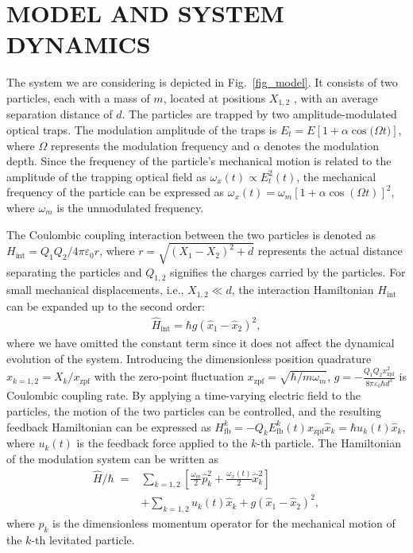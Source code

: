 \documentclass[
aps,
reprint,
superscriptaddress,
amsmath,amssymb,
pra
]{revtex4-2}
\begin{document}
\section{MODEL AND SYSTEM DYNAMICS}
The system we are considering is depicted in Fig.~\ref{fig_model}. It consists of two particles, each with a mass of $m$, located at positions $X_{1,2}$ , with an average separation distance of $d$. The particles are trapped by two amplitude-modulated optical traps. The modulation amplitude of the traps is $E_t = E[{ 1+ \alpha \cos ({\Omega }t})]$, where $\Omega$ represents the modulation frequency and $\alpha$ denotes the modulation depth. Since the frequency of the particle's mechanical motion is related to the amplitude of the trapping optical field as $\omega _x(t) \propto E_t^2(t)$, the mechanical frequency of the particle can be expressed as ${{\omega }_{x}}\left( t \right)={{\omega }_{m}}{{\left[ 1+\alpha \cos \left( {\Omega}t \right) \right]}^{2}}$, where $\omega_m$ is the unmodulated frequency.

The Coulombic coupling interaction between the two particles is denoted as $H_\text{int} = Q_1Q_2/4\pi \varepsilon _0r$, where $r = \sqrt{(X_1 - X_2)^2 + d}$ represents the actual distance separating the particles and $Q_{1,2}$ signifies the charges carried by the particles. For small mechanical displacements, i.e., $X_{1,2} \ll d$, the interaction Hamiltonian  $H_\text{int}$ can be expanded up to the second order:
\begin{align}
   {\hat{H}_{\operatorname{int}}} = \hbar g{{\left( {\hat{x}_{1}}-{\hat{x}_{2}} \right)}^{2}}, 
\end{align}
where we have omitted the constant term since it does not affect the dynamical evolution of the system. Introducing the dimensionless position quadrature $\hat x_{k = 1,2} = X_k/x_\text{zpf}$ with the zero-point fluctuation $x_\text{zpf} = \sqrt{\hbar/m\omega_m}$, $g = - \frac{Q_1Q_2x_\text{zpf}^2}{8\pi\varepsilon_0\hbar d^3}$ is Coulombic coupling rate. By applying a time-varying electric field to the particles, the motion of the two particles can be controlled, and the resulting feedback Hamiltonian can be expressed as $H_\text{fb}^k = -Q_k E_\text{fb}^k(t) x_\text{zpf}\hat x_k = \hbar u_k(t)\hat x_k$, where $u_k(t)$ is the feedback force applied to the $k$-th particle. The Hamiltonian of the modulation system can be written as 
\begin{align}
  \hat{H}/{\hbar }\;  = & \sum\limits_{k =  1,2}{\left[ \frac{{{\omega }_{m}}}{2}\hat p_{k}^{2}+\frac{{{\omega }_{x}}\left( t \right)}{2}\hat x_{k}^{2} \right]} \nonumber  \\
  & +\sum\limits_{k =  1,2}{{{u}_{k}}\left( t \right){\hat{x}_{k}}}+g{{\left( {\hat{x}_{1}}-{\hat{x}_{2}} \right)}^{2}}, 
   \label{hmt1}
\end{align} 
where $\hat p_k$ is the dimensionless momentum operator for the mechanical motion of the $k$-th levitated particle. 
\end{document}
